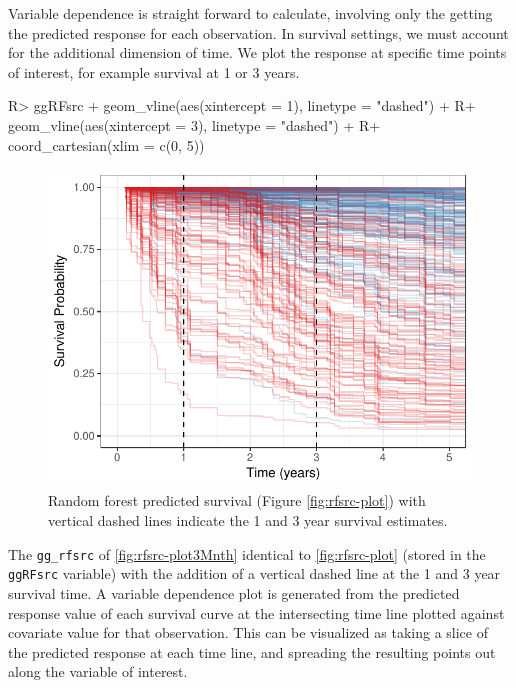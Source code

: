 \documentclass[article]{jss}
\begin{document}
Variable dependence is straight forward to calculate, involving only the
getting the predicted response for each observation. In survival
settings, we must account for the additional dimension of time. We plot
the response at specific time points of interest, for example survival
at 1 or 3 years.

\begin{Schunk}
\begin{Sinput}
R> ggRFsrc + geom_vline(aes(xintercept = 1), linetype = "dashed") +
R+    geom_vline(aes(xintercept = 3), linetype = "dashed") +
R+   coord_cartesian(xlim = c(0, 5))
\end{Sinput}
\begin{figure}[!htb]

{\centering \includegraphics{rfs-rfsrc-plot3Mnth-1} 

}

\caption{Random forest predicted survival (Figure \ref{fig:rfsrc-plot}) with vertical dashed lines indicate the 1 and 3 year survival estimates.}\label{fig:rfsrc-plot3Mnth}
\end{figure}
\end{Schunk}

The \texttt{gg\_rfsrc} of \autoref{fig:rfsrc-plot3Mnth} identical to
\autoref{fig:rfsrc-plot} (stored in the \texttt{ggRFsrc} variable) with
the addition of a vertical dashed line at the 1 and 3 year survival
time. A variable dependence plot is generated from the predicted
response value of each survival curve at the intersecting time line
plotted against covariate value for that observation. This can be
visualized as taking a slice of the predicted response at each time
line, and spreading the resulting points out along the variable of
interest.
\end{document}
